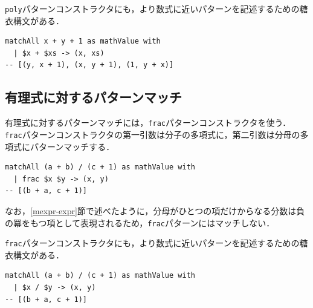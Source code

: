 \lstinline{poly}パターンコンストラクタにも，より数式に近いパターンを記述するための糖衣構文がある．
\begin{lstlisting}[language=egison,numbers=none]
matchAll x + y + 1 as mathValue with
  | $x + $xs -> (x, xs)
-- [(y, x + 1), (x, y + 1), (1, y + x)]
\end{lstlisting}

\subsection{有理式に対するパターンマッチ}

有理式に対するパターンマッチには，\lstinline{frac}パターンコンストラクタを使う．
\lstinline{frac}パターンコンストラクタの第一引数は分子の多項式に，第二引数は分母の多項式にパターンマッチする．
\begin{lstlisting}[language=egison,numbers=none]
matchAll (a + b) / (c + 1) as mathValue with
  | frac $x $y -> (x, y)
-- [(b + a, c + 1)]
\end{lstlisting}
なお，\ref{mexpr-expr}節で述べたように，分母がひとつの項だけからなる分数は負の冪をもつ項として表現されるため，\lstinline{frac}パターンにはマッチしない．

\lstinline{frac}パターンコンストラクタにも，より数式に近いパターンを記述するための糖衣構文がある．
\begin{lstlisting}[language=egison,numbers=none]
matchAll (a + b) / (c + 1) as mathValue with
  | $x / $y -> (x, y)
-- [(b + a, c + 1)]
\end{lstlisting}
